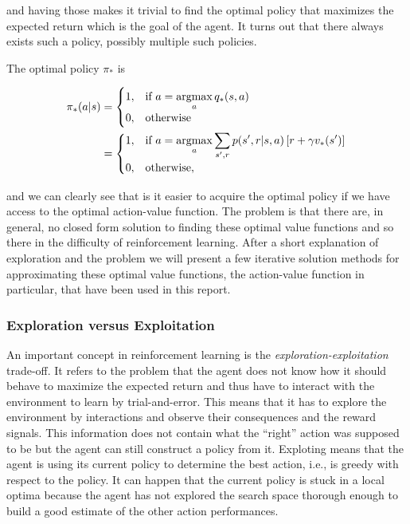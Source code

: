 \documentclass[result.tex]{subfiles}
\begin{document}
    and having those makes it trivial to find the optimal policy that maximizes the expected return which is the goal of the agent. It turns out that there always exists such a policy, possibly multiple such policies.

    The optimal policy $\pi_\ast$ is

    \begin{align*}
        \pi_\ast(a | s) &=
        \begin{cases}
            1, & \text{if}\ a = \displaystyle\operatorname*{argmax}_{a} q_\ast(s, a) \\
            0, & \text{otherwise}
        \end{cases} \\
        &=
        \begin{cases}
            1, & \text{if}\ a = \displaystyle\operatorname*{argmax}_{a} \sum_{s^\prime, r} p(s^\prime, r | s, a) \left[ r + \gamma v_\ast(s^\prime) \right] \\
            0, & \text{otherwise},
        \end{cases} \\
    \end{align*}

    and we can clearly see that is it easier to acquire the optimal policy if we have access to the optimal action-value function. The problem is that there are, in general, no closed form solution to finding these optimal value functions and so there in the difficulty of reinforcement learning. After a short explanation of exploration and the problem we will present a few iterative solution methods for approximating these optimal value functions, the action-value function in particular, that have been used in this report.

    \subsubsection*{Exploration versus Exploitation}

    An important concept in reinforcement learning is the \textit{exploration-exploitation} trade-off. It refers to the problem that the agent does not know how it should behave to maximize the expected return and thus have to interact with the environment to learn by trial-and-error. This means that it has to explore the environment by interactions and observe their consequences and the reward signals. This information does not contain what the \enquote{right} action was supposed to be but the agent can still construct a policy from it. Exploting means that the agent is using its current policy to determine the best action, i.e., is greedy with respect to the policy. It can happen that the current policy is stuck in a local optima because the agent has not explored the search space thorough enough to build a good estimate of the other action performances.
\end{document}
